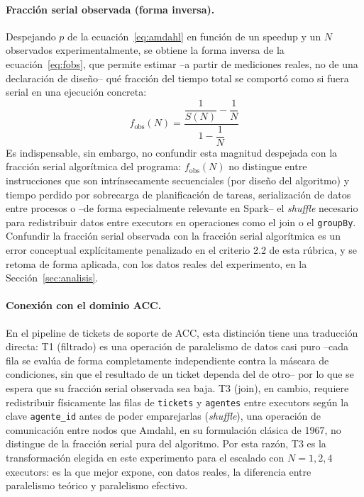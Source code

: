 \documentclass[11pt,a4paper]{article}
\begin{document}
\paragraph{Fracci\'on serial observada (forma inversa).}
Despejando $p$ de la ecuaci\'on~\eqref{eq:amdahl} en funci\'on de un speedup
y un $N$ observados experimentalmente, se obtiene la forma inversa de la
ecuaci\'on~\eqref{eq:fobs}, que permite estimar --a partir de mediciones
reales, no de una declaraci\'on de dise\~no-- qu\'e fracci\'on del tiempo
total se comport\'o como si fuera serial en una ejecuci\'on concreta:
\begin{equation}
f_{\mathrm{obs}}(N) = \frac{\dfrac{1}{S(N)} - \dfrac{1}{N}}{1 - \dfrac{1}{N}}
\label{eq:fobs}
\end{equation}
Es indispensable, sin embargo, no confundir esta magnitud despejada con la
fracci\'on serial algor\'itmica del programa: $f_{\mathrm{obs}}(N)$ no
distingue entre instrucciones que son intr\'insecamente secuenciales (por
dise\~no del algoritmo) y tiempo perdido por sobrecarga de planificaci\'on de
tareas, serializaci\'on de datos entre procesos o --de forma especialmente
relevante en Spark-- el \emph{shuffle} necesario para redistribuir datos
entre executors en operaciones como el join o el \texttt{groupBy}. Confundir
la fracci\'on serial observada con la fracci\'on serial algor\'itmica es un
error conceptual expl\'icitamente penalizado en el criterio 2.2 de esta
r\'ubrica, y se retoma de forma aplicada, con los datos reales del
experimento, en la Secci\'on~\ref{sec:analisis}.

\paragraph{Conexi\'on con el dominio ACC.}
En el pipeline de tickets de soporte de ACC, esta distinci\'on tiene una
traducci\'on directa: T1 (filtrado) es una operaci\'on de paralelismo de
datos casi puro --cada fila se eval\'ua de forma completamente independiente
contra la m\'ascara de condiciones, sin que el resultado de un ticket
dependa del de otro-- por lo que se espera que su fracci\'on serial observada
sea baja. T3 (join), en cambio, requiere redistribuir f\'isicamente las
filas de \texttt{tickets} y \texttt{agentes} entre executors seg\'un la
clave \texttt{agente\_id} antes de poder emparejarlas (\emph{shuffle}), una
operaci\'on de comunicaci\'on entre nodos que Amdahl, en su formulaci\'on
cl\'asica de 1967, no distingue de la fracci\'on serial pura del algoritmo.
Por esta raz\'on, T3 es la transformaci\'on elegida en este experimento para
el escalado con $N=1,2,4$ executors: es la que mejor expone, con datos
reales, la diferencia entre paralelismo te\'orico y paralelismo efectivo.
\end{document}
